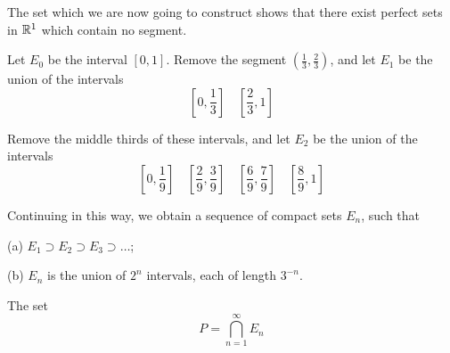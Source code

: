 \begin{mydef}
    \label{mydef:2.44}
	 The set which we are now going to construct shows
	that there exist perfect sets in ${\protect\mathbb R}^{1}$ which contain no segment.
\end{mydef}


Let $E_0$ be the interval $[0, 1]$. Remove the segment $(\frac{1}{3}, \frac{2}{3})$, and let $E_1$ be the union of the intervals
\begin{equation*}
    \left[0, \frac{1}{3}\right] \quad 
    \left[\frac{2}{3}, 1\right]
\end{equation*}

Remove the middle thirds of these intervals, and let $E_2$ be the union of the intervals
\begin{equation*}
    \left[0, \frac{1}{9}\right] \quad 
    \left[\frac{2}{9}, \frac{3}{9}\right] \quad 
    \left[\frac{6}{9}, \frac{7}{9}\right] \quad 
    \left[\frac{8}{9}, 1\right]
\end{equation*}

Continuing in this way, we obtain a sequence of compact sets $E_n$, such that

(a) $E_1 \supset E_2 \supset E_3 \supset \dots$;

(b) $E_n$ is the union of $2^n$ intervals, each of length $3^{-n}$.

The set
\begin{equation*}
    P = \bigcap_{n=1}^{\infty} E_n
\end{equation*}

